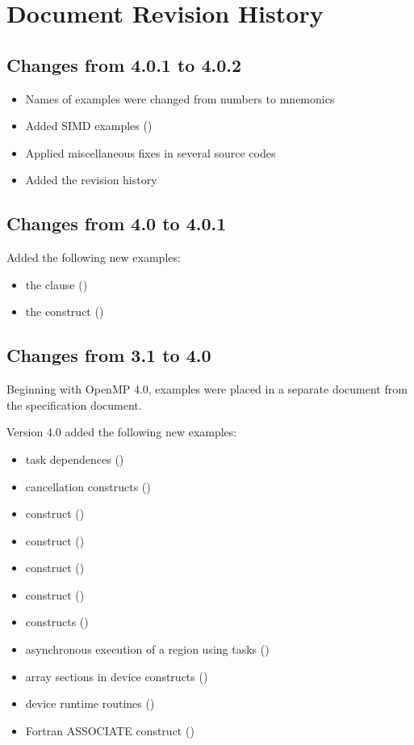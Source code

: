 \chapter{Document Revision History}
\label{chap:history}

\section{Changes from 4.0.1 to 4.0.2}

\begin{itemize}
\item Names of examples were changed from numbers to mnemonics
\item Added SIMD examples ()
\item Applied miscellaneous fixes in several source codes
\item Added the revision history
\end{itemize}

\section{Changes from 4.0 to 4.0.1}

Added the following new examples:
\begin{itemize}
\item the  clause ()
\item the  construct ()
\end{itemize}

\section{Changes from 3.1 to 4.0}

Beginning with OpenMP 4.0, examples were placed in a separate document
from the specification document.

Version 4.0 added the following new examples:
\begin{itemize}
\item task dependences ()
\item cancellation constructs ()
\item {} construct ()
\item {}  construct ()
\item {}  construct ()
\item {}  construct ()
\item {} constructs ()
\item asynchronous execution of a  region using tasks
 ()
\item array sections in device constructs ()
\item device runtime routines ()
\item Fortran ASSOCIATE construct ()
\end{itemize}
